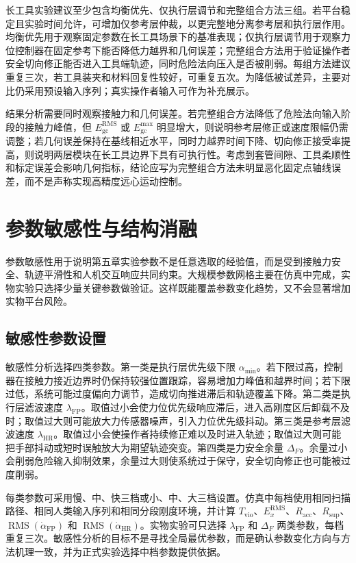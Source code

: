 长工具实验建议至少包含均衡优先、仅执行层调节和完整组合方法三组。若平台稳定且实验时间允许，可增加仅参考层仲裁，以更完整地分离参考层和执行层作用。均衡优先用于观察固定参数在长工具场景下的基准表现；仅执行层调节用于观察力位控制器在固定参考下能否降低力越界和几何误差；完整组合方法用于验证操作者安全切向修正能否进入工具端轨迹，同时危险法向压入是否被削弱。每组方法建议重复三次，若工具装夹和材料回复性较好，可重复五次。为降低被试差异，主要对比仍采用预设输入序列；真实操作者输入可作为补充展示。

结果分析需要同时观察接触力和几何误差。若完整组合方法降低了危险法向输入阶段的接触力峰值，但 $E_{\mathrm{gc}}^{\mathrm{RMS}}$ 或 $E_{\mathrm{gc}}^{\max}$ 明显增大，则说明参考层修正或速度限幅仍需调整；若几何误差保持在基线相近水平，同时力越界时间下降、切向修正接受率提高，则说明两层模块在长工具边界下具有可执行性。考虑到套管间隙、工具柔顺性和标定误差会影响几何指标，结论应写为完整组合方法未明显恶化固定点轴线误差，而不是声称实现高精度远心运动控制。

\section{参数敏感性与结构消融}
\label{sec:ch5_sensitivity_ablation}

参数敏感性用于说明第五章实验参数不是任意选取的经验值，而是受到接触力安全、轨迹平滑性和人机交互响应共同约束。大规模参数网格主要在仿真中完成，实物实验只选择少量关键参数做验证。这样既能覆盖参数变化趋势，又不会显著增加实物平台风险。

\subsection{敏感性参数设置}
\label{subsec:ch5_sensitivity_setting}

敏感性分析选择四类参数。第一类是执行层优先级下限 $\alpha_{\min}$。若下限过高，控制器在接触力接近边界时仍保持较强位置跟踪，容易增加力峰值和越界时间；若下限过低，系统可能过度偏向力调节，造成切向推进滞后和轨迹覆盖下降。第二类是执行层滤波速度 $\lambda_{\mathrm{FP}}$。取值过小会使力位优先级响应滞后，进入高刚度区后卸载不及时；取值过大则可能放大力传感器噪声，引入力位优先级抖动。第三类是参考层滤波速度 $\lambda_{\mathrm{HR}}$。取值过小会使操作者持续修正难以及时进入轨迹；取值过大则可能把手部抖动或短时误触放大为期望轨迹突变。第四类是力安全余量 $\Delta_F$。余量过小会削弱危险输入抑制效果，余量过大则使系统过于保守，安全切向修正也可能被过度削弱。

每类参数可采用慢、中、快三档或小、中、大三档设置。仿真中每档使用相同扫描路径、相同人类输入序列和相同分段刚度环境，并计算 $T_{\mathrm{vio}}$、$E_x^{\mathrm{RMS}}$、$R_{\mathrm{acc}}$、$R_{\mathrm{sup}}$、$\operatorname{RMS}(\dot\alpha_{\mathrm{FP}})$ 和 $\operatorname{RMS}(\dot\alpha_{\mathrm{HR}})$。实物实验可只选择 $\lambda_{\mathrm{FP}}$ 和 $\Delta_F$ 两类参数，每档重复三次。敏感性分析的目标不是寻找全局最优参数，而是确认参数变化方向与方法机理一致，并为正式实验选择中档参数提供依据。

